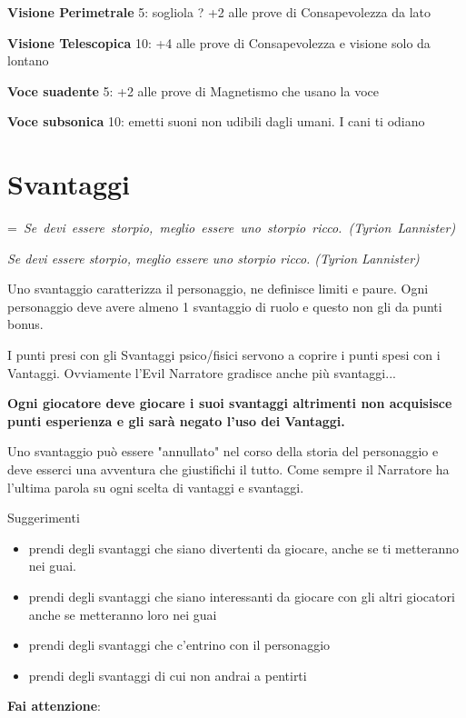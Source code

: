 \documentclass[a4paper,11pt,twoside,openany]{book}
\makeatletter
\newcommand{\mybox}[1]{%
	\setbox0=\hbox{#1}%
	\setlength{\@tempdima}{\dimexpr\wd0+13pt}%
	\begin{tcolorbox}[boxrule=0.5pt,arc=4pt, breakable,enhanced,
		left=6pt,right=6pt,top=6pt,bottom=6pt,boxsep=0pt,width=\@tempdima]
		#1
	\end{tcolorbox}
}
\makeatother
\begin{document}
{\textbf{Visione Perimetrale} 5: sogliola ? +2 alle prove di Consapevolezza da lato

\textbf{Visione Telescopica} 10: +4 alle prove di Consapevolezza e visione solo da lontano

\textbf{Voce suadente} 5: +2 alle prove di Magnetismo che usano la voce

\textbf{Voce subsonica} 10: emetti suoni non udibili dagli umani. I cani ti odiano

\pagebreak

\section{Svantaggi}

\label{svantaggi}
\mybox{\textit{
Se devi essere storpio, meglio essere uno storpio ricco. (Tyrion Lannister)}}\medskip

Uno svantaggio caratterizza il personaggio, ne definisce limiti e paure. Ogni personaggio deve avere almeno 1 svantaggio di ruolo e questo non gli da punti bonus.

I punti presi con gli Svantaggi psico/fisici servono a coprire i punti spesi con i Vantaggi. Ovviamente l'Evil Narratore gradisce anche più svantaggi...

\textbf{Ogni giocatore deve giocare i suoi svantaggi altrimenti non acquisisce punti esperienza e gli sarà negato l'uso dei Vantaggi.}

Uno svantaggio può essere "annullato" nel corso della storia del personaggio e deve esserci una avventura che giustifichi il tutto. Come sempre il Narratore ha l'ultima parola su ogni scelta di vantaggi e svantaggi.

\bigskip

Suggerimenti
\begin{itemize}
\item 
prendi degli svantaggi che siano divertenti da giocare, anche se ti metteranno nei guai. 
\item 
prendi degli svantaggi che siano interessanti da giocare con gli altri giocatori anche se metteranno loro nei guai 
\item 
prendi degli svantaggi che c'entrino con il personaggio 
\item 
prendi degli svantaggi di cui non andrai a pentirti 
\end{itemize}

\textbf{Fai attenzione}:

}
\end{document}
